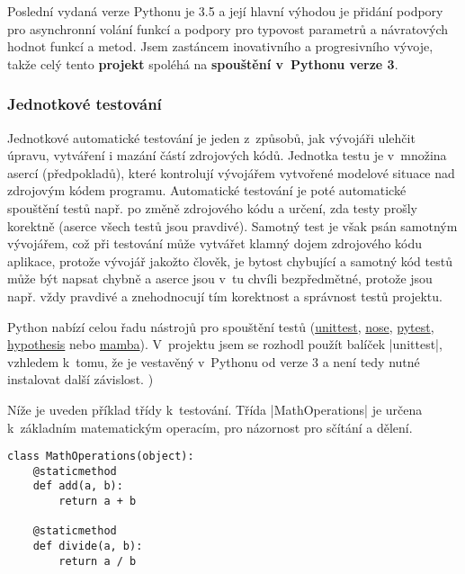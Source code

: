 Poslední vydaná verze Pythonu je 3.5 a její hlavní výhodou je přidání podpory pro asynchronní volání funkcí a podpory pro typovost parametrů a návratových hodnot funkcí a metod. Jsem zastáncem inovativního a progresivního vývoje, takže celý tento \textbf{projekt} spoléhá na \textbf{spouštění v~Pythonu verze 3}.

\subsubsection{Jednotkové testování}
\label{subsubsec:unit-testing}

\begin{sloppypar}
	Jednotkové automatické testování je jeden z~způsobů, jak vývojáři ulehčit úpravu, vytváření i mazání částí zdrojových kódů. Jednotka testu je v~množina asercí (předpokladů), které kontrolují vývojářem vytvořené modelové situace nad zdrojovým kódem programu. Automatické testování je poté automatické spouštění testů např. po změně zdrojového kódu a určení, zda testy prošly korektně (aserce všech testů jsou pravdivé). Samotný test je však psán samotným vývojářem, což při testování může vytvářet klamný dojem  zdrojového kódu aplikace, protože vývojář jakožto člověk, je bytost chybující a samotný kód testů může být napsat chybně a aserce jsou v~tu chvíli bezpředmětné, protože jsou např. vždy pravdivé a znehodnocují tím korektnost a správnost testů projektu.

	Python nabízí celou řadu nástrojů pro spouštění testů (\href{https://docs.python.org/3/library/unittest.html}{unittest}, \href{https://nose.readthedocs.org/en/latest/}{nose}, \href{http://pytest.org/latest/}{pytest}, \href{https://github.com/DRMacIver/hypothesis}{hypothesis} nebo \href{http://nestorsalceda.github.io/mamba/}{mamba}). V~projektu jsem se rozhodl použít balíček \ic|unittest|, vzhledem k~tomu, že je vestavěný v~Pythonu od verze 3 a není tedy nutné instalovat další závislost.
)
\end{sloppypar}

Níže je uveden příklad třídy k~testování. Třída \ic|MathOperations| je určena k~základním matematickým operacím, pro názornost pro sčítání a dělení. 
\begin{lstlisting}[caption={Příklad třídy $MathOperations$ k~testování}]
class MathOperations(object):
	@staticmethod
	def add(a, b):
		return a + b

	@staticmethod
	def divide(a, b):
		return a / b
\end{lstlisting}

